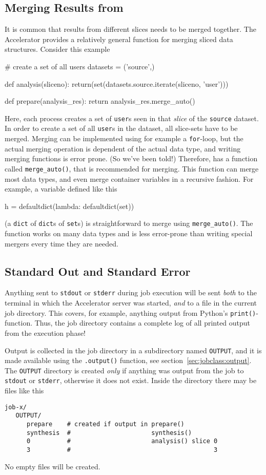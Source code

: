 \subsection{Merging Results from \analysis}
It is common that results from different slices needs to be merged
together.  The Accelerator provides a relatively general function for
merging sliced data structures.  Consider this example
\begin{python}
# create a set of all users
datasets = ('source',)
  
def analysis(sliceno):
    return(set(datasets.source.iterate(sliceno, 'user')))

def prepare(analysis_res):
    return analysis_res.merge_auto()
\end{python}
Here, each \analysis process creates a set of \texttt{user}s seen in
that \textsl{slice} of the \texttt{source} dataset.  In order to
create a set of all \texttt{user}s in the dataset, all slice-sets have
to be merged.  Merging can be implemented using for example a
\texttt{for}-loop, but the actual merging operation is dependent of
the actual data type, and writing merging functions is error
prone. (So we've been told!)  Therefore, \analysisres has a function
called \texttt{merge\_auto()}, that is recommended for merging.  This
function can merge most data types, and even merge container variables
in a recursive fashion.  For example, a variable defined like this
\begin{python}
h = defaultdict(lambda: defaultdict(set))
\end{python}
(a \texttt{dict} of \texttt{dict}s of \texttt{set}s) is
straightforward to merge using \texttt{merge\_auto()}.  The function
works on many data types and is less error-prone than writing special
mergers every time they are needed.


\subsection{Standard Out and Standard Error}
\label{sec:OUTPUT}
Anything sent to \texttt{stdout} or \texttt{stderr} during job
execution will be sent \textsl{both} to the terminal in which the
Accelerator server was started, \textsl{and} to a file in the current
job directory.  This covers, for example, anything output from
Python's \texttt{print()}-function.  Thus, the job directory contains
a complete log of all printed output from the execution phase!

Output is collected in the job directory in a subdirectory named
\texttt{OUTPUT}, and it is made available using the \texttt{.output()}
function, see section~\ref{sec:jobclass:output}.  The \texttt{OUTPUT}
directory is created \textsl{only} if anything was output from the job
to \texttt{stdout} or \texttt{stderr}, otherwise it does not exist.
Inside the directory there may be files like this
\begin{verbatim}
job-x/
   OUTPUT/
      prepare    # created if output in prepare()
      synthesis  #                      synthesis()
      0          #                      analysis() slice 0
      3          #                                       3
\end{verbatim}
No empty files will be created.


